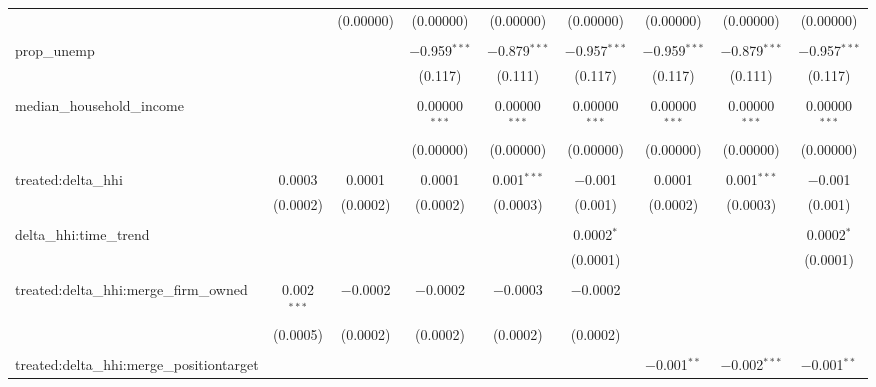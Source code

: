 \begin{table}[H]
{\begin{tabular}{@{\extracolsep{5pt}}lcccccccc}
   &  & (0.00000) & (0.00000) & (0.00000) & (0.00000) & (0.00000) & (0.00000) & (0.00000) \\  

   & & & & & & & & \\  

  prop\_unemp &  &  & $-$0.959$^{***}$ & $-$0.879$^{***}$ & $-$0.957$^{***}$ & $-$0.959$^{***}$ & $-$0.879$^{***}$ & $-$0.957$^{***}$ \\  

   &  &  & (0.117) & (0.111) & (0.117) & (0.117) & (0.111) & (0.117) \\  

   & & & & & & & & \\  

  median\_household\_income &  &  & 0.00000$^{***}$ & 0.00000$^{***}$ & 0.00000$^{***}$ & 0.00000$^{***}$ & 0.00000$^{***}$ & 0.00000$^{***}$ \\  

   &  &  & (0.00000) & (0.00000) & (0.00000) & (0.00000) & (0.00000) & (0.00000) \\  

   & & & & & & & & \\  

  treated:delta\_hhi & 0.0003 & 0.0001 & 0.0001 & 0.001$^{***}$ & $-$0.001 & 0.0001 & 0.001$^{***}$ & $-$0.001 \\  

   & (0.0002) & (0.0002) & (0.0002) & (0.0003) & (0.001) & (0.0002) & (0.0003) & (0.001) \\  

   & & & & & & & & \\  

  delta\_hhi:time\_trend &  &  &  &  & 0.0002$^{*}$ &  &  & 0.0002$^{*}$ \\  

   &  &  &  &  & (0.0001) &  &  & (0.0001) \\  

   & & & & & & & & \\  

  treated:delta\_hhi:merge\_firm\_owned & 0.002$^{***}$ & $-$0.0002 & $-$0.0002 & $-$0.0003 & $-$0.0002 &  &  &  \\  

   & (0.0005) & (0.0002) & (0.0002) & (0.0002) & (0.0002) &  &  &  \\  

   & & & & & & & & \\  

  treated:delta\_hhi:merge\_positiontarget &  &  &  &  &  & $-$0.001$^{**}$ & $-$0.002$^{***}$ & $-$0.001$^{**}$ \\  


\end{tabular}}
\end{table}
